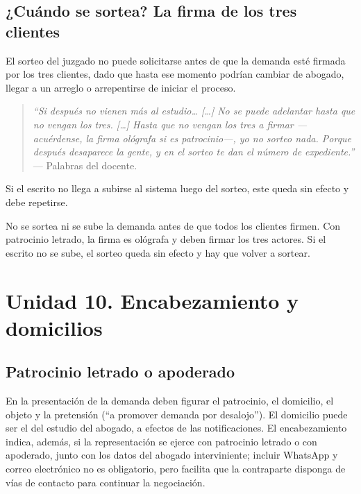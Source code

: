 \documentclass[12pt,oneside]{book}
\begin{document}
\subsection*{¿Cuándo se sortea? La firma de los tres clientes}

El sorteo del juzgado no puede solicitarse antes de que la demanda esté firmada por los tres clientes, dado que hasta ese momento podrían cambiar de abogado, llegar a un arreglo o arrepentirse de iniciar el proceso.

\begin{quote}
\textit{``Si después no vienen más al estudio… […] No se puede adelantar hasta que no vengan los tres. […] Hasta que no vengan los tres a firmar —acuérdense, la firma ológrafa si es patrocinio—, yo no sorteo nada. Porque después desaparece la gente, y en el sorteo te dan el número de expediente.''} --- Palabras del docente.
\end{quote}

Si el escrito no llega a subirse al sistema luego del sorteo, este queda sin efecto y debe repetirse.

\begin{important}
No se sortea ni se sube la demanda antes de que todos los clientes firmen. Con patrocinio letrado, la firma es ológrafa y deben firmar los tres actores. Si el escrito no se sube, el sorteo queda sin efecto y hay que volver a sortear.
\end{important}

\section*{Unidad 10. Encabezamiento y domicilios}

\subsection*{Patrocinio letrado o apoderado}

En la presentación de la demanda deben figurar el patrocinio, el domicilio, el objeto y la pretensión (``a promover demanda por desalojo''). El domicilio puede ser el del estudio del abogado, a efectos de las notificaciones. El encabezamiento indica, además, si la representación se ejerce con patrocinio letrado o con apoderado, junto con los datos del abogado interviniente; incluir WhatsApp y correo electrónico no es obligatorio, pero facilita que la contraparte disponga de vías de contacto para continuar la negociación.
\end{document}
